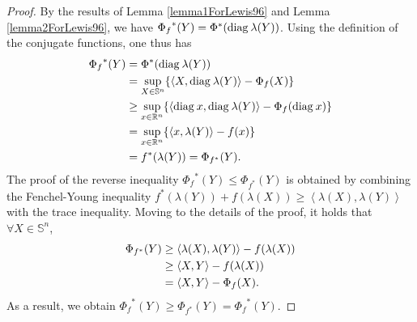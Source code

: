 \documentclass[a4paper,11pt, oneside]{book}
\theoremstyle{definition}
\newcommand{\NDemenstionalRealEuclideanSpace}{\mathbb{R}^n}
\newcommand{\NDemenstionalRealSymmetricMatrixSpace}{\mathbb{S}^n}
\newcommand{\Diagnosis}[1]{\text{\rm diag\:${#1}$}} %
\newcommand{\InnerProduct}[2]{\left\langle {#1},{#2}\right\rangle} %
\newcommand{\ConjugateFunction}[1]{{#1}^*}
\begin{document}
\begin{proof}
  By the results of Lemma \ref{lemma1ForLewis96} and Lemma \ref{lemma2ForLewis96}, we have $\ConjugateFunction{\Phi_f}(Y) = \ConjugateFunction{\Phi}(\Diagnosis{\lambda (Y)})$. Using the definition of the conjugate functions, one thus has
  \begin{equation}
    \begin{split}
      \ConjugateFunction{\Phi_f}(Y) &= \ConjugateFunction{\Phi}(\Diagnosis{\lambda (Y)})\\
      &= \sup_{X \in \NDemenstionalRealSymmetricMatrixSpace} \{\InnerProduct{X}{\Diagnosis{\lambda (Y)}} - \Phi_f(X)\}\\
      &\geq \sup_{x \in \NDemenstionalRealEuclideanSpace} \{\InnerProduct{\Diagnosis{x}}{\Diagnosis{\lambda (Y)}} - \Phi_f(\Diagnosis{x})\}\\
      &= \sup_{x \in \NDemenstionalRealEuclideanSpace} \{\InnerProduct{x}{\lambda (Y)} - f(x)\}\\
      &= \ConjugateFunction{f}(\lambda (Y)) = \Phi_{\ConjugateFunction{f}}(Y). \notag
    \end{split}
  \end{equation}
  The proof of the reverse inequality $\ConjugateFunction{\Phi_f}(Y) \leq \Phi_{\ConjugateFunction{f}}(Y)$ is obtained by combining the Fenchel-Young inequality $\ConjugateFunction{f}(\lambda(Y)) + f(\lambda(X)) \geq \InnerProduct{\lambda(X)}{\lambda(Y)}$ with the trace inequality. Moving to the details of the proof, it holds that $\forall X \in \NDemenstionalRealSymmetricMatrixSpace$,
  \begin{equation}
    \begin{split}
      \Phi_{\ConjugateFunction{f}}(Y) &\geq \InnerProduct{\lambda(X)}{\lambda(Y)} - f(\lambda(X))\\
      &\geq \InnerProduct{X}{Y} - f(\lambda(X))\\
      &= \InnerProduct{X}{Y} - \Phi_f(X). \notag
    \end{split}
  \end{equation}
  As a result, we obtain $\ConjugateFunction{\Phi_f}(Y) \geq \Phi_{\ConjugateFunction{f}}(Y) = \ConjugateFunction{\Phi_f}(Y)$.
\end{proof}
\end{document}
